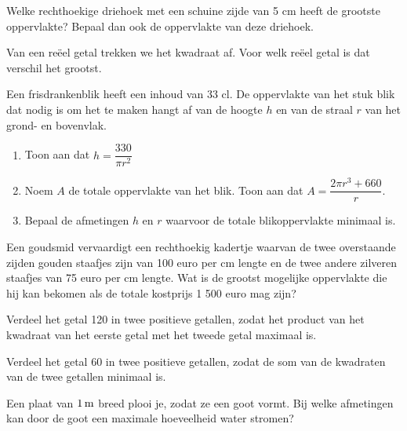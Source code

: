 \documentclass[a4paper,12pt,twoside]{article}
\begin{document}
\begin{oefening}
  Welke rechthoekige driehoek met een schuine zijde van 5 cm heeft de grootste
  oppervlakte? Bepaal dan ook de oppervlakte van deze driehoek.
\end{oefening}

\begin{oefening}
  Van een reëel getal trekken we het kwadraat af. Voor welk reëel getal is dat verschil het grootst.
\end{oefening}

\begin{oefening}
  Een frisdrankenblik heeft een inhoud van 33 cl. De oppervlakte van het stuk blik dat nodig is om het te maken hangt af van de hoogte $h$ en van de straal $r$ van het grond- en
  bovenvlak.
  \begin{enumerate}
  \item Toon aan dat $h=\dfrac{330}{\pi r^2}$
  \item Noem $A$ de totale oppervlakte van het blik. Toon aan dat $A=\dfrac{2\pi r^3 + 660}{r}$.
  \item Bepaal de afmetingen $h$ en $r$ waarvoor de totale blikoppervlakte minimaal is.
  \end{enumerate}
\end{oefening}

\begin{oefening}
  Een goudsmid vervaardigt een rechthoekig kadertje waarvan de twee overstaande zijden gouden staafjes zijn van 100 euro per cm lengte en de twee andere zilveren staafjes van 75 euro per cm lengte. Wat is de grootst mogelijke oppervlakte die hij kan bekomen als de totale kostprijs 1 500 euro mag zijn?
\end{oefening}

\begin{oefening}
  Verdeel het getal 120 in twee positieve getallen, zodat het product van het kwadraat van het eerste getal met het tweede getal maximaal is.
\end{oefening}

\begin{oefening}
  Verdeel het getal 60 in twee positieve getallen, zodat de som van de kwadraten van de twee getallen minimaal is.
\end{oefening}

\begin{oefening}
  Een plaat van $1 \m$ breed plooi je, zodat ze een goot vormt. Bij welke afmetingen kan door de goot een maximale hoeveelheid water stromen?
\end{oefening}
\end{document}
